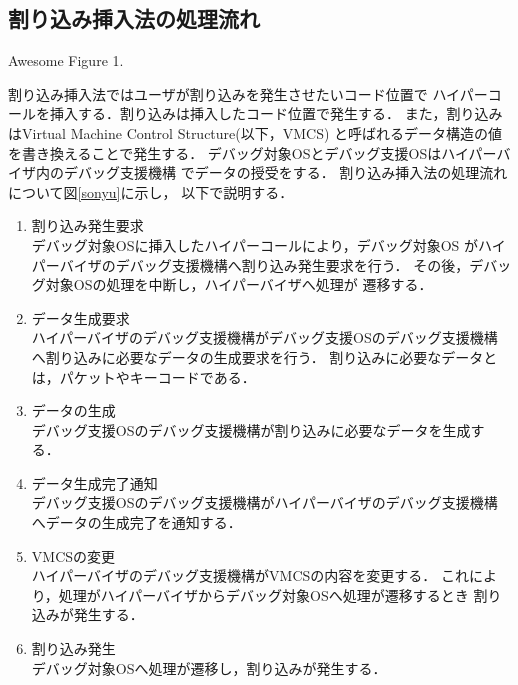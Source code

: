 \documentclass[tanilab-enum]{graduate}
\begin{document}
    \subsection{割り込み挿入法の処理流れ}
    {Awesome Figure 1.}

    割り込み挿入法ではユーザが割り込みを発生させたいコード位置で
    ハイパーコールを挿入する．割り込みは挿入したコード位置で発生する．
    また，割り込みはVirtual Machine Control Structure(以下，VMCS)
    と呼ばれるデータ構造の値を書き換えることで発生する．
    デバッグ対象OSとデバッグ支援OSはハイパーバイザ内のデバッグ支援機構
    でデータの授受をする．
    割り込み挿入法の処理流れについて図\ref{sonyu}に示し，
    以下で説明する．
    \begin{enumerate}
        \item 割り込み発生要求\\
            デバッグ対象OSに挿入したハイパーコールにより，デバッグ対象OS
            がハイパーバイザのデバッグ支援機構へ割り込み発生要求を行う．
            その後，デバッグ対象OSの処理を中断し，ハイパーバイザへ処理が
            遷移する．
        \item データ生成要求\\
            ハイパーバイザのデバッグ支援機構がデバッグ支援OSのデバッグ支援機構
            へ割り込みに必要なデータの生成要求を行う．
            割り込みに必要なデータとは，パケットやキーコードである．
        \item データの生成\\
            デバッグ支援OSのデバッグ支援機構が割り込みに必要なデータを生成する．
        \item データ生成完了通知\\
            デバッグ支援OSのデバッグ支援機構がハイパーバイザのデバッグ支援機構
            へデータの生成完了を通知する．
        \item VMCSの変更\\
            ハイパーバイザのデバッグ支援機構がVMCSの内容を変更する．
            これにより，処理がハイパーバイザからデバッグ対象OSへ処理が遷移するとき
            割り込みが発生する．
        \item 割り込み発生\\
            デバッグ対象OSへ処理が遷移し，割り込みが発生する．
    \end{enumerate}
\end{document}
